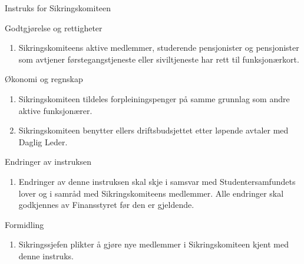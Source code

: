 \begin{instruks}{Instruks for Sikringskomiteen}{}{}
    \begin{instruksledd}{Godtgjørelse og rettigheter}
        \begin{enumerate}
            \item Sikringskomiteens aktive medlemmer, studerende pensjonister og pensjonister som
                avtjener førstegangstjeneste eller siviltjeneste har rett til funksjonærkort.
        \end{enumerate}
    \end{instruksledd}

    \begin{instruksledd}{Økonomi og regnskap}
        \begin{enumerate}
            \item Sikringskomiteen tildeles forpleiningspenger på samme grunnlag som andre aktive
                funksjonærer.
            \item Sikringskomiteen benytter ellers driftsbudsjettet etter løpende avtaler med
                Daglig Leder.
        \end{enumerate}
    \end{instruksledd}

    \begin{instruksledd}{ Endringer av instruksen}
        \begin{enumerate}
            \item Endringer av denne instruksen skal skje i samsvar med Studentersamfundets lover
                og i samråd med
                Sikringskomiteens medlemmer. Alle endringer skal godkjennes av Finansstyret før
                den er gjeldende.
        \end{enumerate}
    \end{instruksledd}

    \begin{instruksledd}{Formidling}
        \begin{enumerate}
            \item Sikringssjefen plikter å gjøre nye medlemmer i Sikringskomiteen kjent med denne
                instruks.
        \end{enumerate}
    \end{instruksledd}

\end{instruks}





